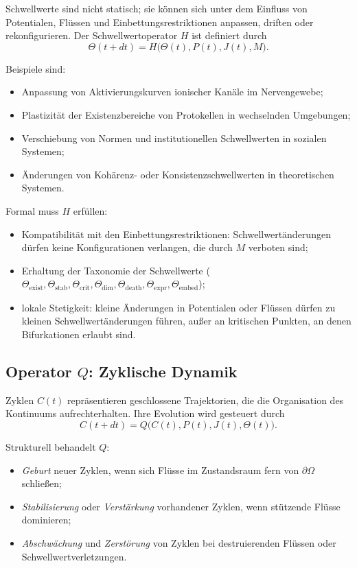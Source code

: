 Schwellwerte sind nicht statisch; sie können sich unter dem Einfluss von
Potentialen, Flüssen und Einbettungsrestriktionen anpassen, driften oder
rekonfigurieren. Der Schwellwertoperator \(H\) ist definiert durch
\[
  \Theta(t+dt) = H\big(\Theta(t), P(t), J(t), M\big).
\]

Beispiele sind:
\begin{itemize}
  \item Anpassung von Aktivierungskurven ionischer Kanäle im Nervengewebe;
  \item Plastizität der Existenzbereiche von Protokellen in wechselnden
        Umgebungen;
  \item Verschiebung von Normen und institutionellen Schwellwerten in
        sozialen Systemen;
  \item Änderungen von Kohärenz- oder Konsistenzschwellwerten in
        theoretischen Systemen.
\end{itemize}

Formal muss \(H\) erfüllen:
\begin{itemize}
  \item Kompatibilität mit den Einbettungsrestriktionen: Schwellwertänderungen
        dürfen keine Konfigurationen verlangen, die durch \(M\) verboten sind;
  \item Erhaltung der Taxonomie der Schwellwerte
        (\(\Theta_{\mathrm{exist}}, \Theta_{\mathrm{stab}},
        \Theta_{\mathrm{crit}}, \Theta_{\mathrm{dim}},
        \Theta_{\mathrm{death}}, \Theta_{\mathrm{expr}}, \Theta_{\mathrm{embed}}\));
  \item lokale Stetigkeit: kleine Änderungen in Potentialen oder Flüssen dürfen
        zu kleinen Schwellwertänderungen führen, außer an kritischen Punkten,
        an denen Bifurkationen erlaubt sind.
\end{itemize}

\subsection{Operator \texorpdfstring{\texorpdfstring{$Q$}{Q}}{Q}: Zyklische Dynamik}

Zyklen \(C(t)\) repräsentieren geschlossene Trajektorien, die die
Organisation des Kontinuums aufrechterhalten. Ihre Evolution wird gesteuert durch
\[
  C(t+dt) = Q\big(C(t), P(t), J(t), \Theta(t)\big).
\]

Strukturell behandelt \(Q\):
\begin{itemize}
  \item \emph{Geburt} neuer Zyklen, wenn sich Flüsse im Zustandsraum fern von
        \(\partial\Omega\) schließen;
  \item \emph{Stabilisierung} oder \emph{Verstärkung} vorhandener Zyklen,
        wenn stützende Flüsse dominieren;
  \item \emph{Abschwächung} und \emph{Zerstörung} von Zyklen bei destruierenden
        Flüssen oder Schwellwertverletzungen.
\end{itemize}

